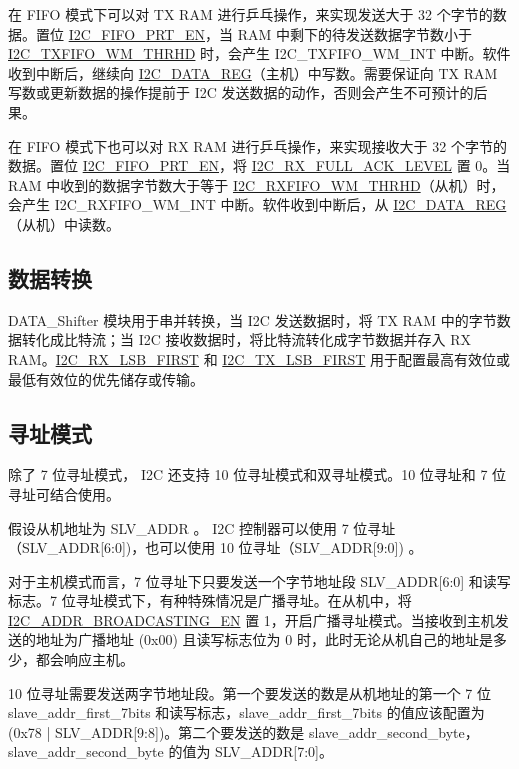 \documentclass[main\_\_CN.tex]{subfiles}
\begin{document}
在 FIFO 模式下可以对 TX RAM 进行乒乓操作，来实现发送大于 32 个字节的数据。置位 \hyperref[fielddesc:I2CFIFOPRTEN]{I2C\_FIFO\_PRT\_EN}，当 RAM 中剩下的待发送数据字节数小于 \hyperref[fielddesc:I2CTXFIFOWMTHRHD]{I2C\_TXFIFO\_WM\_THRHD} 时，会产生 I2C\_TXFIFO\_WM\_INT 中断。软件收到中断后，继续向 \hyperref[regdesc:I2CDATAREG]{I2C\_DATA\_REG}（主机）中写数。需要保证向 TX RAM 写数或更新数据的操作提前于 I2C 发送数据的动作，否则会产生不可预计的后果。

在 FIFO 模式下也可以对 RX RAM 进行乒乓操作，来实现接收大于 32 个字节的数据。置位 \hyperref[fielddesc:I2CFIFOPRTEN]{I2C\_FIFO\_PRT\_EN}，将 \hyperref[fielddesc:I2CRXFULLACKLEVEL]{I2C\_RX\_FULL\_ACK\_LEVEL} 置 0。当 RAM 中收到的数据字节数大于等于 \hyperref[fielddesc:I2CRXFIFOWMTHRHD]{I2C\_RXFIFO\_WM\_THRHD}（从机）时，会产生 I2C\_RXFIFO\_WM\_INT 中断。软件收到中断后，从 \hyperref[regdesc:I2CDATAREG]{I2C\_DATA\_REG}（从机）中读数。

\subsection{数据转换}
DATA\_Shifter 模块用于串并转换，当 I2C 发送数据时，将 TX RAM 中的字节数据转化成比特流；当 I2C 接收数据时，将比特流转化成字节数据并存入 RX RAM。\hyperref[fielddesc:I2CRXLSBFIRST]{I2C\_RX\_LSB\_FIRST} 和 \hyperref[fielddesc:I2CTXLSBFIRST]{I2C\_TX\_LSB\_FIRST} 用于配置最高有效位或最低有效位的优先储存或传输。

\subsection{寻址模式}
除了 7 位寻址模式，\chipname{} I2C 还支持 10 位寻址模式和双寻址模式。10 位寻址和 7 位寻址可结合使用。

假设从机地址为 SLV\_ADDR 。 \chipname{} I2C 控制器可以使用 7 位寻址（SLV\_ADDR[6:0])，也可以使用 10 位寻址（SLV\_ADDR[9:0]) 。

对于主机模式而言，7 位寻址下只要发送一个字节地址段 SLV\_ADDR[6:0] 和读写标志。7 位寻址模式下，有种特殊情况是广播寻址。在从机中，将 \hyperref[fielddesc:I2CADDRBROADCASTINGEN]{I2C\_ADDR\_BROADCASTING\_EN} 置 1，开启广播寻址模式。当接收到主机发送的地址为广播地址 (0x{}00) 且读写标志位为 0 时，此时无论从机自己的地址是多少，都会响应主机。

10 位寻址需要发送两字节地址段。第一个要发送的数是从机地址的第一个 7 位 slave\_addr\_first\_7bits 和读写标志，slave\_addr\_first\_7bits 的值应该配置为 (0x{}78 | SLV\_ADDR[9:8])。第二个要发送的数是 slave\_addr\_second\_byte，slave\_addr\_second\_byte 的值为 SLV\_ADDR[7:0]。
\end{document}
